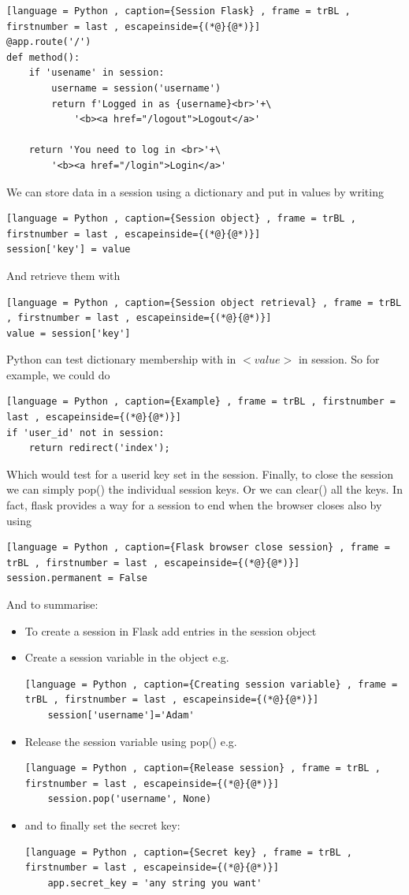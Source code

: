 \documentclass[a4paper]{article}
\theoremstyle{plain}
\theoremstyle{definition}
\theoremstyle{remark}
\begin{document}
\begin{flushleft}
\begin{lstlisting}[language = Python , caption={Session Flask} , frame = trBL , firstnumber = last , escapeinside={(*@}{@*)}]
@app.route('/')
def method():
	if 'usename' in session:
		username = session('username')
		return f'Logged in as {username}<br>'+\
			'<b><a href="/logout">Logout</a>'

	return 'You need to log in <br>'+\
		'<b><a href="/login">Login</a>'
\end{lstlisting}
We can store data in a session using a dictionary and put in values by writing
\begin{lstlisting}[language = Python , caption={Session object} , frame = trBL , firstnumber = last , escapeinside={(*@}{@*)}]
session['key'] = value
\end{lstlisting}
And retrieve them with
\begin{lstlisting}[language = Python , caption={Session object retrieval} , frame = trBL , firstnumber = last , escapeinside={(*@}{@*)}]
value = session['key']
\end{lstlisting}
Python can test dictionary membership with in $<value>$ in session. So for example, we could do
\begin{lstlisting}[language = Python , caption={Example} , frame = trBL , firstnumber = last , escapeinside={(*@}{@*)}]
if 'user_id' not in session:
	return redirect('index');
\end{lstlisting}
Which would test for a userid key set in the session. Finally, to close the session we can simply pop() the individual session keys. Or we can clear() all the keys. In fact, flask provides a way for a session to end when the browser closes also by using
\begin{lstlisting}[language = Python , caption={Flask browser close session} , frame = trBL , firstnumber = last , escapeinside={(*@}{@*)}]
session.permanent = False
\end{lstlisting}
And to summarise:
\begin{itemize}
	\item To create a session in Flask add entries in the session object
	\item Create a session variable in the object e.g.
	\begin{lstlisting}[language = Python , caption={Creating session variable} , frame = trBL , firstnumber = last , escapeinside={(*@}{@*)}]
	session['username']='Adam'
	\end{lstlisting}
\item Release the session variable using pop() e.g.
	\begin{lstlisting}[language = Python , caption={Release session} , frame = trBL , firstnumber = last , escapeinside={(*@}{@*)}]
	session.pop('username', None)
	\end{lstlisting}
\item and to finally set the secret key:
	\begin{lstlisting}[language = Python , caption={Secret key} , frame = trBL , firstnumber = last , escapeinside={(*@}{@*)}]
	app.secret_key = 'any string you want'
	\end{lstlisting}


\end{itemize}
\end{flushleft}
\end{document}
